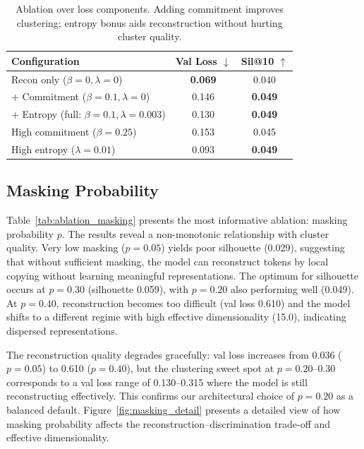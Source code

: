 \documentclass[pmlr]{jmlr}%
\newcommand{\best}[1]{\textbf{#1}}
\begin{document}
\begin{table}[t]
  \centering
  \caption{Ablation over loss components. Adding commitment improves clustering; entropy bonus aids reconstruction without hurting cluster quality.}
  \label{tab:ablation_loss}
  \small
  \begin{tabular}{lcc}
  \toprule
  \textbf{Configuration} & \textbf{Val Loss} $\downarrow$ & \textbf{Sil@10} $\uparrow$ \\
  \midrule
  Recon only ($\beta{=}0, \lambda{=}0$) & \best{0.069} & 0.040 \\
  + Commitment ($\beta{=}0.1, \lambda{=}0$) & 0.146 & \best{0.049} \\
  + Entropy (full: $\beta{=}0.1, \lambda{=}0.003$) & 0.130 & \best{0.049} \\
  High commitment ($\beta{=}0.25$) & 0.153 & 0.045 \\
  High entropy ($\lambda{=}0.01$) & 0.093 & \best{0.049} \\
  \bottomrule
  \end{tabular}
\end{table}

\subsection{Masking Probability}

Table~\ref{tab:ablation_masking} presents the most informative ablation: masking probability $p$. The results reveal a non-monotonic relationship with cluster quality. Very low masking ($p = 0.05$) yields poor silhouette (0.029), suggesting that without sufficient masking, the model can reconstruct tokens by local copying without learning meaningful representations. The optimum for silhouette occurs at $p = 0.30$ (silhouette 0.059), with $p = 0.20$ also performing well (0.049). At $p = 0.40$, reconstruction becomes too difficult (val loss 0.610) and the model shifts to a different regime with high effective dimensionality (15.0), indicating dispersed representations.

The reconstruction quality degrades gracefully: val loss increases from 0.036 ($p = 0.05$) to 0.610 ($p = 0.40$), but the clustering sweet spot at $p = 0.20$--$0.30$ corresponds to a val loss range of 0.130--0.315 where the model is still reconstructing effectively. This confirms our architectural choice of $p = 0.20$ as a balanced default. Figure~\ref{fig:masking_detail} presents a detailed view of how masking probability affects the reconstruction--discrimination trade-off and effective dimensionality.
\end{document}

